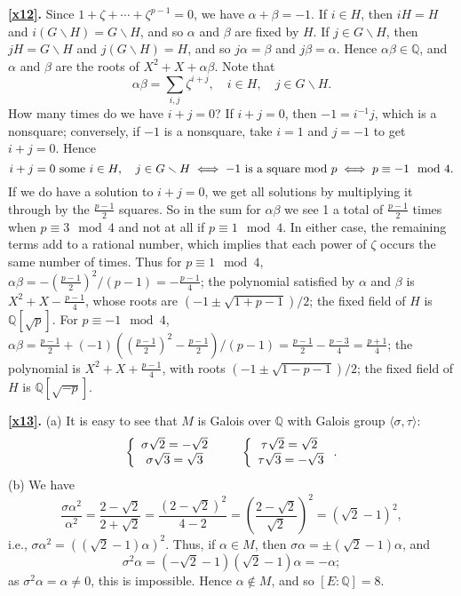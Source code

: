 \documentclass[a4paper,11pt,final,openany]{memoir}
\theoremstyle{nonumberplain}
\begin{document}
\medskip\noindent\textbf{\ref{x12}.} Since $1+\zeta+\cdots+\zeta^{p-1}=0$, we
have $\alpha+\beta=-1$. If $i\in H$, then $iH=H$ and $i(G\smallsetminus
H)=G\smallsetminus H$, and so $\alpha$ and $\beta$ are fixed by $H$. If $j\in
G\smallsetminus H$, then $jH=G\smallsetminus H$ and $j(G\smallsetminus H)=H$,
and so $j\alpha=\beta$ and $j\beta=\alpha$. Hence $\alpha\beta\in{\mathbb{Q}}%
$, and $\alpha$ and $\beta$ are the roots of $X^{2}+X+\alpha\beta$. Note that
\[
\alpha\beta=\sum_{i,j}\zeta^{i+j},\quad i\in H,\quad j\in G\smallsetminus H.
\]
How many times do we have $i+j=0$? If $i+j=0$, then $-1=i^{-1}j$, which is a
nonsquare; conversely, if $-1$ is a nonsquare, take $i=1$ and $j=-1$ to get
$i+j=0$. Hence
\[
i+j=0\text{\textrm{\ some }}i\in H,\quad j\in G\smallsetminus H\iff
-1\text{\textrm{\ is a square mod }}p\iff p\equiv-1\mod4.
\]
If we do have a solution to $i+j=0$, we get all solutions by multiplying it
through by the $\frac{p-1}{2}$ squares. So in the sum for $\alpha\beta$ we see
1 a total of $\frac{p-1}{2}$ times when $p\equiv3\mod4$ and not at all if
$p\equiv1\mod4$. In either case, the remaining terms add to a rational number,
which implies that each power of $\zeta$ occurs the same number of times. Thus
for $p\equiv1\mod4$, $\alpha\beta=-(\frac{p-1}{2})^{2}/(p-1)=-\frac{p-1}{4}$;
the polynomial satisfied by $\alpha$ and $\beta$ is $X^{2}+X-\frac{p-1}{4}$,
whose roots are $(-1\pm\sqrt{1+p-1})/2$; the fixed field of $H$ is
${\mathbb{Q}}[\sqrt{p}]$. For $p\equiv-1\mod4$, $\alpha\beta=\frac{p-1}%
{2}+(-1)\left(  (\frac{p-1}{2})^{2}-\frac{p-1}{2}\right)  /(p-1)=\frac{p-1}%
{2}-\frac{p-3}{4}=\frac{p+1}{4}$; the polynomial is $X^{2}+X+\frac{p-1}{4}$,
with roots $(-1\pm\sqrt{1-p-1})/2$; the fixed field of $H$ is ${\mathbb{Q}%
}[\sqrt{-p}]$.



\medskip\noindent\textbf{\ref{x13}.} (a) It is easy to see that $M$ is Galois
over ${\mathbb{Q}}$ with Galois group $\langle\sigma,\tau\rangle$:%
\[
\left\{
\begin{array}
[c]{c}%
\sigma\sqrt{2}=-\sqrt{2}\newline\\
\sigma\sqrt{3}=\sqrt{3}%
\end{array}
\right.  \quad\quad\left\{
\begin{array}
[c]{c}%
\tau\sqrt{2}=\sqrt{2}\newline\\
\tau\sqrt{3}=-\sqrt{3}%
\end{array}
\right.  .
\]
\noindent(b) We have
\[
\frac{\sigma\alpha^{2}}{\alpha^{2}}=\frac{2-\sqrt{2}}{2+\sqrt{2}}%
=\frac{(2-\sqrt{2})^{2}}{4-2}=\left(  \frac{2-\sqrt{2}}{\sqrt{2}}\right)
^{2}=(\sqrt{2}-1)^{2},
\]
i.e., $\sigma\alpha^{2}=((\sqrt{2}-1)\alpha)^{2}$. Thus, if $\alpha\in M$,
then $\sigma\alpha=\pm(\sqrt{2}-1)\alpha$, and
\[
\sigma^{2}\alpha=(-\sqrt{2}-1)(\sqrt{2}-1)\alpha=-\alpha;
\]
as $\sigma^{2}\alpha=\alpha\neq0$, this is impossible. Hence $\alpha\notin M$,
and so $[E\colon{\mathbb{Q}}]=8$.
\end{document}

